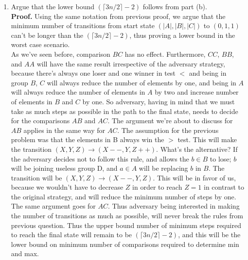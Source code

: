 \documentclass[letterpaper,12pt]{article}
\begin{document}
\begin{enumerate}
\begin{enumerate}
	\item Argue that the lower bound $(\lceil 3n/2 \rceil - 2)$ follows from part (b).\\
	\textbf{Proof.} Using the same notation from previous proof, we argue that the minimum number of transitions from start state $(|A|, |B|, |C|)$ to $(0, 1, 1)$ can't be longer than the $(\lceil 3n/2 \rceil - 2)$, thus proving a lower bound in the worst case scenario.\\
	As we've seen before, comparison $BC$ has no effect. Furthermore, $CC$, $BB$, and $AA$ will have the same result irrespective of the adversary strategy, because there's always one loser and one winner in test $<$ and being in group $B$, $C$ will always reduce the number of elements by one, and being in $A$ will always reduce the number of elements in $A$ by two and increase number of elements in $B$ and $C$ by one. So adversary, having in mind that we must take as much steps as possible in the path to the final state, needs to decide for the comparisons $AB$ and $AC$. The argument we're about to discuss for $AB$ applies in the same way for $AC$. The assumption for the previous problem was that the elements in B always win the $>$ test. This will make the transition $(X, Y, Z) \rightarrow (X--, Y, Z++)$. What's the alternative? If the adversary decides not to follow this rule, and allows the $b \in B$ to lose; $b$ will be joining useless group D, and $a \in A$ will be replacing $b$ in $B$. The transition will be $(X, Y, Z) \rightarrow (X--, Y, Z)$. This will be in favor of us, because we wouldn't have to decrease $Z$ in order to reach $Z=1$ in contrast to the original strategy, and will reduce the minimum number of steps by one. The same argument goes for $AC$. Thus adversary being interested in making the number of transitions as much as possible, will never break the rules from previous question. Thus the upper bound number of minimum steps required to reach the final state will remain to be $(\lceil 3n/2 \rceil - 2)$, and this will be the lower bound on minimum number of comparisons required to determine min and max.


\end{enumerate}
\end{enumerate}
\end{document}

